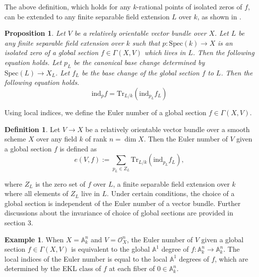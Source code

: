 \documentclass[12pt, reqno]{amsart}
\newtheorem{proposition}[theorem]{Proposition}
\theoremstyle{definition}
\newtheorem{definition}[theorem]{Definition}
\newtheorem{example}[theorem]{Example}
\newcommand{\Spec}{\mathrm{Spec }} %
\newcommand{\A}{\mathbb{A}} %
\newcommand{\Oh}{\mathscr{O}} %
\newcommand{\Tr}{\mathrm{Tr}} %
\newcommand{\ind}{\mathrm{ind}} %
\begin{document}
The above definition, which holds for any $k$-rational points of isolated zeros of $f$, can be extended to any finite separable field extension $L$ over $k$, as shown in \cite[Proposition 34]{kwcubic}.

\begin{proposition} \cite[Proposition 34]{kwcubic} \label{local_index_base_change}
Let $V$ be a relatively orientable vector bundle over $X$. Let $L$ be any finite separable field extension over $k$ such that $p: \Spec(k) \to X$ is an isolated zero of a global section $f \in \Gamma(X, V)$ which lives in $L$.  Then the following equation holds. Let $p_L$ be the canonical base change determined by $\Spec(L) \to X_L$. Let $f_L$ be the base change of the global section $f$ to $L$. Then the following equation holds.
\begin{equation*}
    \ind_p f = \Tr_{L/k} \left( \ind_{p_L} f_L \right)
\end{equation*}
\end{proposition}

Using local indices, we define the Euler number of a global section $f \in \Gamma(X,V)$.
\begin{definition} \cite[Definition 35]{kwcubic} \label{def:eulernumbersection}
Let $V \to X$ be a relatively orientable vector bundle over a smooth scheme $X$ over any field $k$ of rank $n = \dim X$. Then the Euler number of $V$ given a global section $f$ is defined as 
\begin{equation*}
    e(V, f) := \sum_{p_L \in Z_L} \Tr_{L/k} \left( \ind_{p_L} f_L \right),
\end{equation*}
\end{definition}
where $Z_L$ is the zero set of $f$ over $L$, a finite separable field extension over $k$ where all elements of $Z_L$ live in $L$. Under certain conditions, the choice of a global section is independent of the Euler number of a vector bundle. Further discussions about the invariance of choice of global sections are provided in section 3. 

\begin{example} \label{ex:euler_number_A1_degree}
When $X = \A^n_k$ and $V = \Oh^n_X$, the Euler number of $V$ given a global section $f \in \Gamma(X, V)$ is equivalent to the global $\A^1$ degree of $f: \A^n_k \to \A^n_k$. The local indices of the Euler number is equal to the local $\A^1$ degrees of $f$, which are determined by the EKL class of $f$ at each fiber of $0 \in \A^n_k$.
\end{example}
\end{document}
